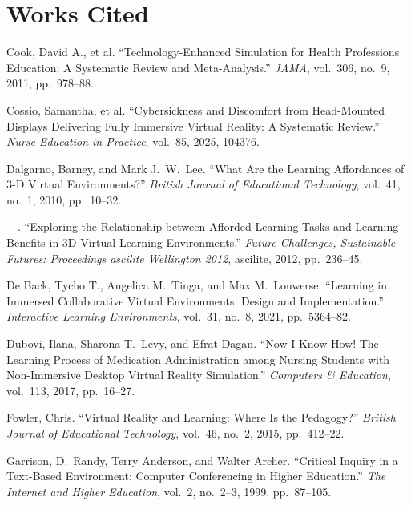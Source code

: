 \documentclass{article}
\newenvironment{workscited}
  {\section*{Works Cited}\begin{list}{}
    {\setlength{\itemindent}{-0.5in}\setlength{\leftmargin}{0.5in}
     \setlength{\itemsep}{0pt}\setlength{\parsep}{6pt}}}
  {\end{list}}
\begin{document}
\begin{workscited}
\item Cook, David A., et al. ``Technology-Enhanced Simulation for Health
Professions Education: A Systematic Review and Meta-Analysis.''
\textit{JAMA}, vol.~306, no.~9, 2011, pp.~978--88. %

\item Cossio, Samantha, et al. ``Cybersickness and Discomfort from
Head-Mounted Displays Delivering Fully Immersive Virtual Reality: A
Systematic Review.'' \textit{Nurse Education in Practice}, vol.~85, 2025,
104376. %

\item Dalgarno, Barney, and Mark J.\ W.\ Lee. ``What Are the Learning
Affordances of 3-D Virtual Environments?'' \textit{British Journal of
Educational Technology}, vol.~41, no.~1, 2010, pp.~10--32. %

\item ---. ``Exploring the Relationship between Afforded Learning Tasks
and Learning Benefits in 3D Virtual Learning Environments.''
\textit{Future Challenges, Sustainable Futures: Proceedings ascilite
Wellington 2012}, ascilite, 2012, pp.~236--45.

\item De Back, Tycho T., Angelica M.\ Tinga, and Max M.\ Louwerse.
``Learning in Immersed Collaborative Virtual Environments: Design and
Implementation.'' \textit{Interactive Learning Environments}, vol.~31,
no.~8, 2021, pp.~5364--82. %

\item Dubovi, Ilana, Sharona T.\ Levy, and Efrat Dagan. ``Now I Know How!
The Learning Process of Medication Administration among Nursing Students
with Non-Immersive Desktop Virtual Reality Simulation.''
\textit{Computers \& Education}, vol.~113, 2017, pp.~16--27.

\item Fowler, Chris. ``Virtual Reality and Learning: Where Is the
Pedagogy?'' \textit{British Journal of Educational Technology}, vol.~46,
no.~2, 2015, pp.~412--22. %

\item Garrison, D.\ Randy, Terry Anderson, and Walter Archer. ``Critical
Inquiry in a Text-Based Environment: Computer Conferencing in Higher
Education.'' \textit{The Internet and Higher Education}, vol.~2,
no.~2--3, 1999, pp.~87--105. %


\end{workscited}
\end{document}
